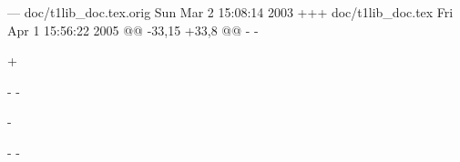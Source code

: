 --- doc/t1lib_doc.tex.orig	Sun Mar  2 15:08:14 2003
+++ doc/t1lib_doc.tex	Fri Apr  1 15:56:22 2005
@@ -33,15 +33,8 @@
-\ifx\pdfoutput\undefined
-  \usepackage[dvips]{graphicx}
+\usepackage[dvips]{graphicx}
-\else
-  \usepackage[pdftex]{graphicx}
-  \usepackage[pdftex,a4paper,pageanchor,hyperfigures,breaklinks,%
-              colorlinks,citecolor=blue,urlcolor=red,linkcolor=magenta]{hyperref}
-  
-\fi
 \setcounter{tocdepth}{3}
 \setcounter{secnumdepth}{3}

